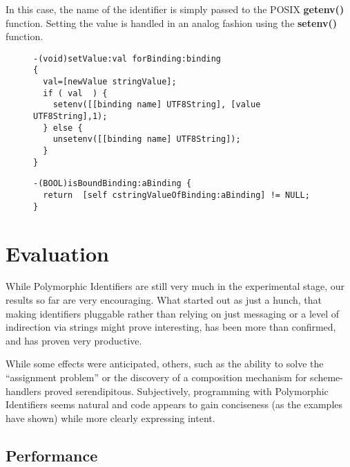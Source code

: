 \documentclass[preprint,authoryear]{llncs}
\begin{document}
In this case, the name of the identifier is simply passed to the POSIX {\bf getenv()} function.
Setting the value is handled in an analog fashion using the {\bf setenv()} function.


\begin{figure}[htbp]
\begin{lstlisting}[style=L,label=setvalue-env,caption=Set value in env: scheme.]
-(void)setValue:val forBinding:binding
{
  val=[newValue stringValue];
  if ( val  ) {
    setenv([[binding name] UTF8String], [value UTF8String],1);
  } else {
    unsetenv([[binding name] UTF8String]);
  }
}
\end{lstlisting}
\end{figure}


\begin{figure}[htbp]
\begin{lstlisting}[style=L,label=hasValue-env,caption=Checking for presence of value in env: scheme.]
-(BOOL)isBoundBinding:aBinding {
  return  [self cstringValueOfBinding:aBinding] != NULL;
}
\end{lstlisting}
\end{figure}




\section{Evaluation}
\label{evaluation}

While Polymorphic Identifiers are still very much in the experimental stage, our
results so far are very encouraging.  What started out as just a hunch, that making
identifiers pluggable rather than relying on just messaging or a level of indirection
via strings might prove interesting, has been more than confirmed, and has proven
very productive.

While some effects were anticipated, others, such as the ability to solve the
``assignment problem'' or the discovery of a composition mechanism for
scheme-handlers proved serendipitous.  Subjectively, programming with Polymorphic
Identifiers seems natural and code appears to gain conciseness (as the examples
have shown) while more clearly expressing intent.


\subsection{Performance}
\end{document}
